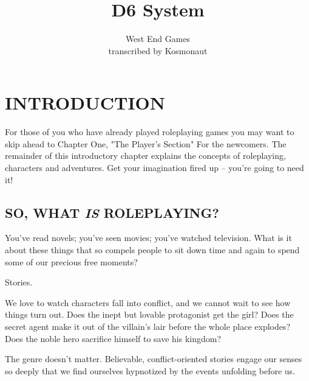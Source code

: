 \documentclass[10pt, a4paper, twoside]{book}
\title{\textbf{D6 System}}
\author{West End Games \\ transcribed by Kosmonaut}
\begin{document}
	\maketitle
	\tableofcontents
	\chapter{INTRODUCTION}
	\begin{multicols}{2}
		For those of you who have already played roleplaying games you may want to skip ahead to Chapter One, "The Player's Section" For the newcomers. The remainder of this introductory chapter explains the concepts of roleplaying, characters and adventures. Get your imagination fired up -- you're going to need it!
		\section*{SO, WHAT \emph{IS} ROLEPLAYING?}
		You've read novels; you've seen movies; you've watched television. What is it about these things that so compels people to sit down time and again to spend some of our precious free moments? \par Stories. \par We love to watch characters fall into conflict, and we cannot wait to see how things turn out. Does the inept but lovable protagonist get the girl? Does the secret agent make it out of the villain's lair before the whole place explodes? Does the noble hero sacrifice himself to save his kingdom? \par The genre doesn't matter. Believable, conflict-oriented stories engage our senses so deeply that we find ourselves hypnotized by the events unfolding before us. 
		\begin{mytextbox}

\end{mytextbox}
\end{multicols}
\end{document}
